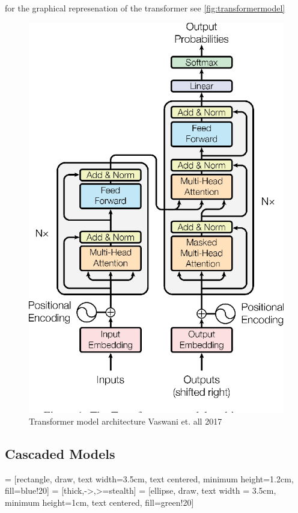 for the graphical represenation of the transformer see \autoref{fig:transformermodel}
\begin{figure}
        \centering%
        \includegraphics[width=0.5\linewidth]{Latex//sections//images/transformermodel.png}
        \caption{Transformer model architecture Vaswani et. all 2017}
        \label{fig:transformermodel}
    \end{figure}

\subsection{Cascaded Models}
 = [rectangle, draw, text width=3.5cm, text centered, minimum height=1.2cm, fill=blue!20]
 = [thick,->,>=stealth]
 = [ellipse, draw, text width = 3.5cm, minimum height=1cm, text centered, fill=green!20]

